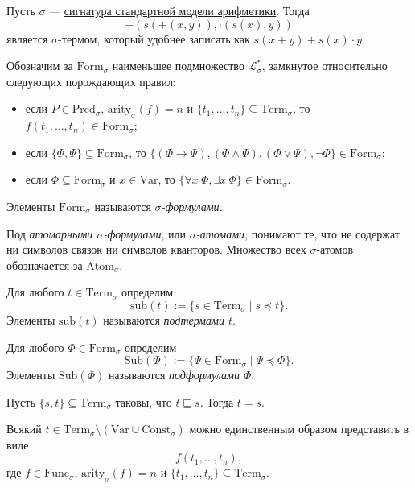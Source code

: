 \documentclass[12pt,a4paper]{article}
\newcommand{\Formul}{\ensuremath{\mathrm{Form}}\xspace}
\newcommand{\Sub}{\ensuremath{\mathrm{Sub}}\xspace}
\newcommand{\Pred}{\ensuremath{\mathrm{Pred}}\xspace}
\newcommand{\Func}{\ensuremath{\mathrm{Func}}\xspace}
\newcommand{\Const}{\ensuremath{\mathrm{Const}}\xspace}
\newcommand{\arity}{\ensuremath{\mathrm{arity}}\xspace}
\newcommand{\Var}{\ensuremath{\mathrm{Var}}\xspace}
\newcommand{\Term}{\ensuremath{\mathrm{Term}}\xspace}
\newcommand{\Atom}{\ensuremath{\mathrm{Atom}}\xspace}
\newcommand{\sub}{\ensuremath{\mathrm{sub}}\xspace}
\begin{document}
    \begin{example}
        Пусть $\sigma$ --- \hyperlink{R-signature-definition}{сигнатура стандартной модели арифметики}. Тогда
        \[{+}(s({+}(x, y)), {\cdot}(s(x), y))\]
        является $\sigma$-термом, который удобнее записать как $s(x + y) + s(x) \cdot y$.
    \end{example}

    \begin{definition}
        Обозначим за $\Formul_\sigma$ наименьшее подмножество $\mathscr{L}_\sigma^*$, замкнутое относительно следующих порождающих правил:
        \begin{itemize}
            \item если $P \in \Pred_\sigma$, $\arity_\sigma(f) = n$ и $\{t_1, \dots, t_n\} \subseteq \Term_\sigma$, то $f(t_1, \dots, t_n) \in \Formul_\sigma$;
            \item если $\{\Phi, \Psi\} \subseteq \Formul_\sigma$, то $\{(\Phi \rightarrow \Psi), (\Phi \wedge \Psi), (\Phi \vee \Psi), \neg \Phi\} \in \Formul_\sigma$;
            \item если $\Phi \subseteq \Formul_\sigma$ и $x \in \Var$, то $\{\forall x\ \Phi, \exists x\ \Phi\} \in \Formul_\sigma$.
        \end{itemize}
        Элементы $\Formul_\sigma$ называются \emph{$\sigma$-формулами}.

        Под \emph{атомарными $\sigma$-формулами}, или \emph{$\sigma$-атомами}, понимают те, что не содержат ни символов связок ни символов кванторов. Множество всех $\sigma$-атомов обозначается за $\Atom_\sigma$.
    \end{definition}

    \begin{definition}
        Для любого $t \in \Term_\sigma$ определим
        \[\sub(t) := \{s \in \Term_\sigma \mid s \preccurlyeq t\}.\]
        Элементы $\sub(t)$ называются \emph{подтермами $t$}.
        
        Для любого $\Phi \in \Formul_\sigma$ определим
        \[\Sub(\Phi) := \{\Psi \in \Formul_\sigma \mid \Psi \preccurlyeq \Phi\}.\]
        Элементы $\Sub(\Phi)$ называются \emph{подформулами $\Phi$}.
    \end{definition}

    \begin{lemma}
        Пусть $\{s, t\} \subseteq \Term_\sigma$ таковы, что $t \sqsubseteq s$. Тогда $t = s$.
    \end{lemma}

    \begin{theorem}
        Всякий $t \in \Term_\sigma \setminus (\Var \cup \Const_\sigma)$ можно единственным образом представить в виде
        \[f(t_1, \dots, t_n),\]
        где $f \in \Func_\sigma$, $\arity_\sigma(f) = n$ и $\{t_1, \dots, t_n\} \subseteq \Term_\sigma$.
    \end{theorem}
\end{document}
